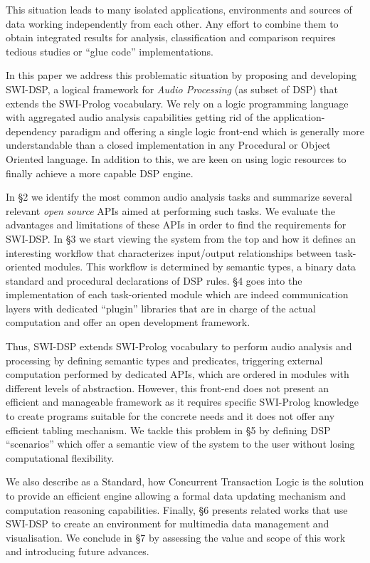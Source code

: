 \documentclass[runningheads]{llncs}
\begin{document}
This situation leads to many isolated applications, environments and sources of data working independently from each other. Any effort to combine them to obtain integrated results for analysis, classification and comparison requires tedious studies or ``glue code'' implementations.

In this paper we address this problematic situation by proposing and developing SWI-DSP, a logical framework for \textit{Audio Processing} (as subset of DSP) that extends the SWI-Prolog vocabulary. We rely on a logic programming language with aggregated audio analysis capabilities getting rid of the application-dependency paradigm and offering a single logic front-end which is generally more understandable than a closed implementation in any Procedural or Object Oriented language. In addition to this, we are keen on using logic resources to finally achieve a more capable DSP engine.

In \S 2 we identify the most common audio analysis tasks and summarize several relevant \textit{open source} APIs aimed at performing such tasks. We evaluate the advantages and limitations of these APIs in order to find the requirements for SWI-DSP. In \S 3 we start viewing the system from the top and how it defines an interesting workflow that characterizes input/output relationships between task-oriented modules. This workflow is determined by semantic types, a binary data standard and procedural declarations of DSP rules. \S 4 goes into the implementation of each task-oriented module which are indeed communication layers with dedicated ``plugin'' libraries that are in charge of the actual computation and offer an open development framework.

Thus, SWI-DSP extends SWI-Prolog vocabulary to perform audio analysis and processing by defining semantic types and predicates, triggering external computation performed by dedicated APIs, which are ordered in modules with different levels of abstraction. However, this front-end does not present an efficient and manageable framework as it requires specific SWI-Prolog knowledge to create programs suitable for the concrete needs and it does not offer any efficient tabling mechanism. We tackle this problem in \S 5 by defining DSP ``scenarios'' which offer a semantic view of the system to the user without losing computational flexibility. 

We also describe as a Standard, how Concurrent Transaction Logic is the solution to provide an efficient engine allowing a formal data updating mechanism and computation reasoning capabilities. Finally, \S 6 presents related works that use SWI-DSP to create an environment for multimedia data management and visualisation. We conclude in \S 7 by assessing the value and scope of this work and introducing future advances.
\end{document}
